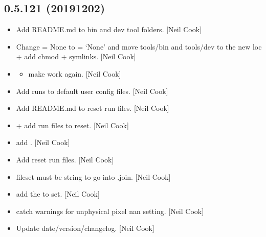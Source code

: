 \documentclass[a4paper,10pt,english]{report}
\begin{document}
\subsection{0.5.121 (2019\sphinxhyphen{}12\sphinxhyphen{}02)}
\label{\detokenize{misc/changelog:id40}}\begin{itemize}
\item {} 
Add README.md to bin and dev tool folders. {[}Neil Cook{]}

\item {} 
Change  = None to  = ‘None’ and move
tools/bin and tools/dev to the new loc + add chmod + symlinks. {[}Neil
Cook{]}

\item {} \begin{itemize}
\item {} 
make  work again. {[}Neil Cook{]}

\end{itemize}

\item {} 
Add runs to default user config files. {[}Neil Cook{]}

\item {} 
Add README.md to reset run files. {[}Neil Cook{]}

\item {} 
 +  \sphinxhyphen{} add run files to reset. {[}Neil
Cook{]}

\item {} 
 \sphinxhyphen{} add . {[}Neil
Cook{]}

\item {} 
Add reset run files. {[}Neil Cook{]}

\item {} 
 \sphinxhyphen{} fileset must be string to go
into .join. {[}Neil Cook{]}

\item {} 
 \sphinxhyphen{} add the  to
 set. {[}Neil Cook{]}

\item {} 
 \sphinxhyphen{} catch warnings for unphysical pixel nan
setting. {[}Neil Cook{]}

\item {} 
Update date/version/changelog. {[}Neil Cook{]}

\end{itemize}
\end{document}
